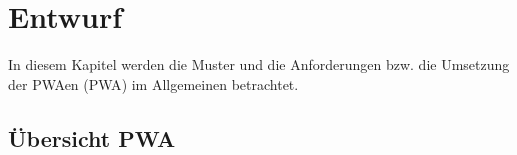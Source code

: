 \chapter{Entwurf}
\thispagestyle{standard}
\pagestyle{standard}
\renewcommand{\footrulewidth}{0.4pt}

In diesem Kapitel werden die Muster und die Anforderungen bzw. die Umsetzung der \acl{PWA}en (\acs{PWA}) im Allgemeinen betrachtet.


\section{Übersicht PWA}\label{sub:Übersicht PWA}





